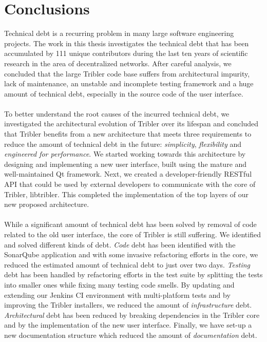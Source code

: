 \chapter{Conclusions}
\label{chapter:conclusions}

Technical debt is a recurring problem in many large software engineering projects. The work in this thesis investigates the technical debt that has been accumulated by 111 unique contributors during the last ten years of scientific research in the area of decentralized networks. After careful analysis, we concluded that the large Tribler code base suffers from architectural impurity, lack of maintenance, an unstable and incomplete testing framework and a huge amount of technical debt, especially in the source code of the user interface.\\\\
To better understand the root causes of the incurred technical debt, we investigated the architectural evolution of Tribler over its lifespan and concluded that Tribler benefits from a new architecture that meets three requirements to reduce the amount of technical debt in the future: \emph{simplicity}, \emph{flexibility} and \emph{engineered for performance}. We started working towards this architecture by designing and implementing a new user interface, built using the mature and well-maintained Qt framework. Next, we created a developer-friendly RESTful API that could be used by external developers to communicate with the core of Tribler, libtribler. This completed the implementation of the top layers of our new proposed architecture.\\\\
While a significant amount of technical debt has been solved by removal of code related to the old user interface, the core of Tribler is still suffering. We identified and solved different kinds of debt. \emph{Code} debt has been identified with the SonarQube application and with some invasive refactoring efforts in the core, we reduced the estimated amount of technical debt to just over two days. \emph{Testing} debt has been handled by refactoring efforts in the test suite by splitting the tests into smaller ones while fixing many testing code smells. By updating and extending our Jenkins CI environment with multi-platform tests and by improving the Tribler installers, we reduced the amount of \emph{infrastructure} debt. \emph{Architectural} debt has been reduced by breaking dependencies in the Tribler core and by the implementation of the new user interface. Finally, we have set-up a new documentation structure which reduced the amount of \emph{documentation} debt.\\\\
